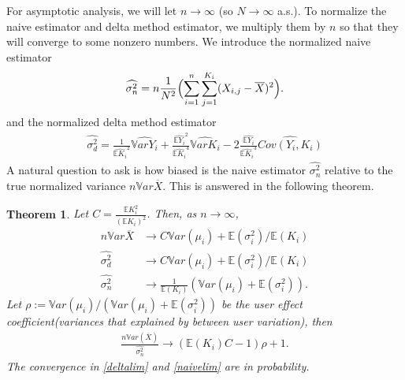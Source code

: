 \documentclass[10pt]{article}
\newcommand{\wht}{\widehat}
\newcommand{\var}{\ensuremath{\mathbb Var}}
\newcommand{\bbe}{\mathbb{E}}
\newcommand{\xbar}{\overline{X}}
\newcommand{\naiveest}{\wht{\sigma^2_n}}
\newcommand{\deltaest}{\wht{\sigma^2_d}}
\newtheorem{thm}{Theorem}
\begin{document}
For asymptotic analysis, we will let $n\to \infty$ (so $N\to \infty$ a.s.). To normalize the naive estimator and delta method estimator, we multiply them by $n$ so that they will converge to some nonzero numbers.  We introduce the normalized naive estimator 
\begin{align}
\wht{\sigma^2_n} = n\frac{1}{N^2} \Bigl (\sum_{i=1}^n \sum_{j=1}^{K_i} (X_{i,j}-\overline{X})^2 \Bigr ).
\end{align}
and the normalized delta method estimator
\begin{align}
\wht{\sigma^2_d} = \frac{1}{\wht{\bbe K_i}^2}\wht{\var Y_i} + \frac{\wht{\bbe Y_i}^2}{\wht{\bbe K_i}^4}\wht{\var K_i} - 2\frac{\wht{\bbe Y_i}}{\wht{\bbe K_i}^3} \wht{Cov(Y_i,K_i)}
\end{align}
A natural question to ask is how biased is the naive estimator $\naiveest$ relative to the true normalized variance $n\var \xbar$. This is answered in the following theorem.
\begin{thm}\label{thm1.1}
Let $C = \frac{\bbe K_i^2}{(\bbe K_i)^2}$.  Then, as $n\to \infty$,
\begin{align}
n\var\xbar &\to C \var(\mu_i) + \bbe(\sigma^2_i)/\bbe (K_i)\label{truevar} \\
\deltaest & \to  C \var(\mu_i) + \bbe(\sigma^2_i)/\bbe (K_i)\label{deltalim}  \\
\naiveest & \to  \frac{1}{\bbe(K_i)} (\var(\mu_i)+\bbe(\sigma_i^2))\label{naivelim}.
\end{align}
Let $\rho:= \var(\mu_i)/(\var(\mu_i)+\bbe(\sigma^2_i))$ be the user effect coefficient(variances that explained by between user variation), then
\begin{align}
\frac{n\var (\xbar)}{\naiveest} \to  (\bbe(K_i)C - 1)\rho +1.
\end{align}
The convergence in \eqref{deltalim} and \eqref{naivelim} are  in probability. 
\end{thm}
\end{document}

